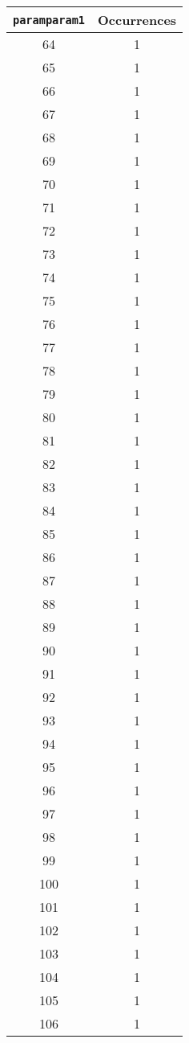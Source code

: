 \begin{longtable}{|c|c|}
\hline
\textbf{\texttt{paramparam1}} & \textbf{Occurrences} \\
\hline
64 & 1 \\
\hline
65 & 1 \\
\hline
66 & 1 \\
\hline
67 & 1 \\
\hline
68 & 1 \\
\hline
69 & 1 \\
\hline
70 & 1 \\
\hline
71 & 1 \\
\hline
72 & 1 \\
\hline
73 & 1 \\
\hline
74 & 1 \\
\hline
75 & 1 \\
\hline
76 & 1 \\
\hline
77 & 1 \\
\hline
78 & 1 \\
\hline
79 & 1 \\
\hline
80 & 1 \\
\hline
81 & 1 \\
\hline
82 & 1 \\
\hline
83 & 1 \\
\hline
84 & 1 \\
\hline
85 & 1 \\
\hline
86 & 1 \\
\hline
87 & 1 \\
\hline
88 & 1 \\
\hline
89 & 1 \\
\hline
90 & 1 \\
\hline
91 & 1 \\
\hline
92 & 1 \\
\hline
93 & 1 \\
\hline
94 & 1 \\
\hline
95 & 1 \\
\hline
96 & 1 \\
\hline
97 & 1 \\
\hline
98 & 1 \\
\hline
99 & 1 \\
\hline
100 & 1 \\
\hline
101 & 1 \\
\hline
102 & 1 \\
\hline
103 & 1 \\
\hline
104 & 1 \\
\hline
105 & 1 \\
\hline
106 & 1 \\

\end{longtable}
